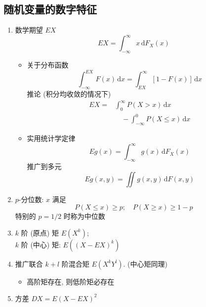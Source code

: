 \documentclass[11pt,a4paper,twocolumn]{article} %
\numberwithin{equation}{section} %
\newcommand{\dif}{\,\mathrm d}
\begin{document}
\subsection{随机变量的数字特征} %
\label{sub:math_chara}
\begin{enumerate}
	\item 数学期望 $EX$
	\begin{equation}
		EX = \int_{-\infty}^\infty x\dif F_X(x)
	\end{equation}
	\begin{itemize}
		\item 关于分布函数
		\begin{equation}
			\int_{-\infty}^{EX} F(x)\dif x = \int_{EX}^{\infty}[1-F(x)]\dif x
		\end{equation}
		推论 (积分均收敛的情况下)
		\begin{equation}
		\begin{split}
			EX = & \int_0^\infty P(X>x)\dif x \\
			&\quad - \int_{-\infty}^0 P(X\le x)\dif x
		\end{split}
		\end{equation}
		\item 实用统计学定律
		\begin{equation}
			Eg(x) = \int_{-\infty}^\infty g(x)\dif F_X(x)
		\end{equation}
		推广到多元
		\begin{equation}
			Eg(x, y) = \iint g(x, y)\dif F(x, y)
		\end{equation}
	\end{itemize}
	\item $p$-分位数: $x$ 满足
	\begin{equation}
		P(X\le x)\ge p; \quad P(X\ge x) \ge 1-p
	\end{equation}
	特别的 $p=1/2$ 时称为中位数
	\item $k$ 阶 (原点) 矩 $E(X^k)$; \\
	$k$ 阶 (中心) 矩: $E((X-EX)^k)$
	\item 推广联合 $k+l$ 阶混合矩 $E(X^kY^l)$. (中心矩同理)
	\begin{itemize}
		\item 高阶矩存在, 则低阶矩必存在
	\end{itemize}
	\item 方差 $DX = E(X - EX)^2$
\end{enumerate}
\end{document}
